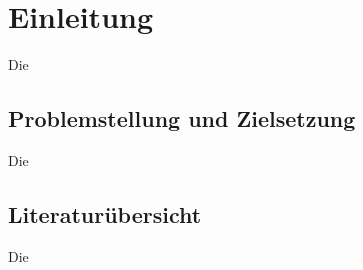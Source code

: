 \chapter[Einleitung]{\label{sec:Einleitung}Einleitung}

Die 

\section{\label{sec:Motivation_Zielstellung}Problemstellung und Zielsetzung}

Die 

\section{\label{sec:Stand_Forschung_Technik}Literaturübersicht}

Die









   

